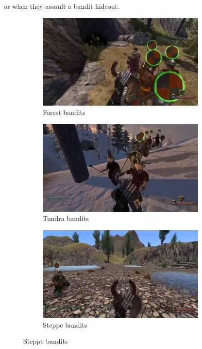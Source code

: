 \documentclass[
]{article}
\begin{document}
or when they assault a bandit hideout.



\begin{figure}
	\centering
	\begin{subfigure}[b]{0.3\textwidth}
		\includegraphics[width=\linewidth]{docimages/E_0041_00_39_58.jpg}
		\caption{Forest bandits}
	\end{subfigure}
	\begin{subfigure}[b]{0.3\textwidth}
		\includegraphics[width=\linewidth]{docimages/E_0054_00_10_54.jpg}
		\caption{Tundra bandits}
	\end{subfigure}
	\begin{subfigure}[b]{0.3\textwidth}
		\includegraphics[width=\linewidth]{docimages/E_0042_00_05_08.jpg}
		\caption{Steppe bandits}
	\end{subfigure}
\end{figure}
\end{document}
